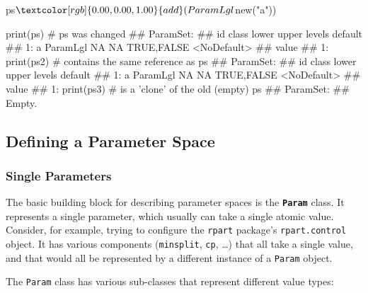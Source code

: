 \documentclass[
  11pt,
  parskip=half,
  DIV=calc,
  BCOR=10mm,
  x11names]{scrbook}
\newenvironment{Shaded}{}{}
\newcommand{\CommentTok}[1]{\textcolor[rgb]{0.00,0.50,0.00}{#1}}
\newcommand{\KeywordTok}[1]{\textcolor[rgb]{0.00,0.00,1.00}{#1}}
\newcommand{\NormalTok}[1]{#1}
\newcommand{\OperatorTok}[1]{#1}
\newcommand{\StringTok}[1]{\textcolor[rgb]{0.00,0.50,0.50}{#1}}
\begin{document}
\begin{Shaded}
\begin{Highlighting}[]
\NormalTok{ps}\OperatorTok{$}\KeywordTok{add}\NormalTok{(ParamLgl}\OperatorTok{$}\KeywordTok{new}\NormalTok{(}\StringTok{"a"}\NormalTok{))}
\end{Highlighting}
\end{Shaded}

\begin{Shaded}
\begin{Highlighting}[]
\KeywordTok{print}\NormalTok{(ps)  }\CommentTok{# ps was changed}
\NormalTok{## ParamSet: }
\NormalTok{##    id    class lower upper      levels     default}
\NormalTok{## 1:  a ParamLgl    NA    NA  TRUE,FALSE <NoDefault>}
\NormalTok{##    value}
\NormalTok{## 1:}
\KeywordTok{print}\NormalTok{(ps2)  }\CommentTok{# contains the same reference as ps}
\NormalTok{## ParamSet: }
\NormalTok{##    id    class lower upper      levels     default}
\NormalTok{## 1:  a ParamLgl    NA    NA  TRUE,FALSE <NoDefault>}
\NormalTok{##    value}
\NormalTok{## 1:}
\KeywordTok{print}\NormalTok{(ps3)  }\CommentTok{# is a 'clone' of the old (empty) ps}
\NormalTok{## ParamSet: }
\NormalTok{## Empty.}
\end{Highlighting}
\end{Shaded}

\hypertarget{defining-a-parameter-space}{%
\subsection{Defining a Parameter Space}\label{defining-a-parameter-space}}

\hypertarget{single-parameters}{%
\subsubsection{Single Parameters}\label{single-parameters}}

The basic building block for describing parameter spaces is the \textbf{\texttt{Param}} class.
It represents a single parameter, which usually can take a single atomic value.
Consider, for example, trying to configure the \texttt{rpart} package's \texttt{rpart.control} object.
It has various components (\texttt{minsplit}, \texttt{cp}, \ldots{}) that all take a single value, and that would all be represented by a different instance of a \texttt{Param} object.

The \texttt{Param} class has various sub-classes that represent different value types:
\end{document}
